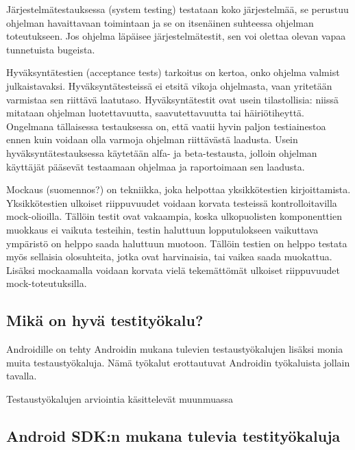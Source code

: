Järjestelmätestauksessa (system testing) testataan koko järjestelmää, se perustuu ohjelman havaittavaan toimintaan ja se on itsenäinen suhteessa ohjelman toteutukseen. Jos ohjelma läpäisee järjestelmätestit, sen voi olettaa olevan vapaa tunnetuista bugeista. \cite[418-421]{testing}

Hyväksyntätestien (acceptance tests) tarkoitus on kertoa, onko ohjelma valmist julkaistavaksi. Hyväksyntätesteissä ei etsitä vikoja ohjelmasta, vaan yritetään varmistaa sen riittävä laatutaso. Hyväksyntätestit ovat usein tilastollisia: niissä mitataan ohjelman luotettavuutta, saavutettavuutta tai häiriötiheyttä. Ongelmana tällaisessa testauksessa on, että vaatii hyvin paljon testiainestoa ennen kuin voidaan olla varmoja ohjelman riittävästä laadusta. Usein hyväksyntätestauksessa käytetään alfa- ja beta-testausta, jolloin ohjelman käyttäjät pääsevät testaamaan ohjelmaa ja raportoimaan sen laadusta. \cite[421-423]{testing}

Mockaus (suomennos?) on tekniikka, joka helpottaa yksikkötestien kirjoittamista. Yksikkötestien ulkoiset riippuvuudet voidaan korvata testeissä kontrolloitavilla mock-olioilla. Tällöin testit ovat vakaampia, koska ulkopuolisten komponenttien muokkaus ei vaikuta testeihin, testin haluttuun lopputulokseen vaikuttava ympäristö on helppo saada haluttuun muotoon. Tällöin testien on helppo testata myös sellaisia olosuhteita, jotka ovat harvinaisia, tai vaikea saada muokattua. Lisäksi mockaamalla voidaan korvata vielä tekemättömät ulkoiset riippuvuudet mock-toteutuksilla. \cite{mocking}

\subsection{Mikä on hyvä testityökalu?}

Androidille on tehty Androidin mukana tulevien testaustyökalujen lisäksi monia muita testaustyökaluja. Nämä työkalut erottautuvat Androidin työkaluista jollain tavalla.

Testaustyökalujen arviointia käsittelevät muunmuassa \cite{poston92}

\subsection{Android SDK:n mukana tulevia testityökaluja}

